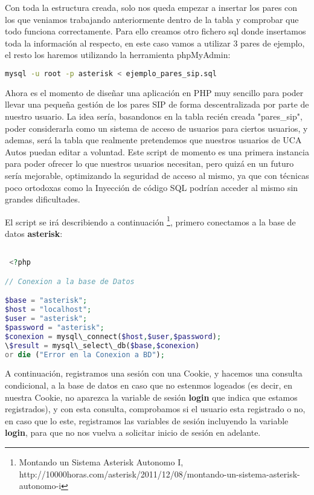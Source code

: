 Con toda la estructura creada, solo nos queda empezar a insertar los pares con los que veniamos trabajando anteriormente dentro de la tabla y comprobar que todo funciona correctamente. Para ello creamos otro fichero sql donde insertamos toda la información al respecto, en este caso vamos a utilizar 3 pares de ejemplo, el resto los haremos utilizando la herramienta phpMyAdmin:



\begin{lstlisting}[language=sh]
mysql -u root -p asterisk < ejemplo_pares_sip.sql
\end{lstlisting}

Ahora es el momento de diseñar una aplicación en PHP muy sencillo para poder llevar una pequeña gestión de los pares SIP de forma descentralizada por parte de nuestro usuario. La idea sería, basandonos en la tabla recién creada "pares\_sip", poder considerarla como un sistema de acceso de usuarios para ciertos usuarios, y ademas, será la tabla que realmente pretendemos que nuestros usuarios de UCA Autos puedan editar a voluntad. Este script de momento es una primera instancia para poder ofrecer lo que nuestros usuarios necesitan, pero quizá en un futuro sería mejorable, optimizando la seguridad de acceso al mismo, ya que con técnicas poco ortodoxas como la Inyección de código SQL podrían acceder al mismo sin grandes dificultades.

El script se irá describiendo a continuación \footnote{Montando un Sistema Asterisk Autonomo I, \\ http://10000horas.com/asterisk/2011/12/08/montando-un-sistema-asterisk-autonomo-i}, primero conectamos a la base de datos \textbf{asterisk}:

\begin{lstlisting}[language=php,title={./www/usuarios.php}]

 <?php

// Conexion a la base de Datos

$base = "asterisk";
$host = "localhost";
$user = "asterisk";
$password = "asterisk";
$conexion = mysql\_connect($host,$user,$password);
\$result = mysql\_select\_db($base,$conexion) 
or die ("Error en la Conexion a BD");

\end{lstlisting}

A continuación, registramos una sesión con una Cookie, y hacemos una consulta condicional, a la base de datos en caso que no estenmos logeados (es decir, en nuestra Cookie, no aparezca la variable de sesión \textbf{login} que indica que estamos registrados), y con esta consulta, comprobamos si el usuario esta registrado o no, en caso que lo este, registramos las variables de sesión incluyendo la variable \textbf{login}, para que no nos vuelva a solicitar inicio de sesión en adelante.

